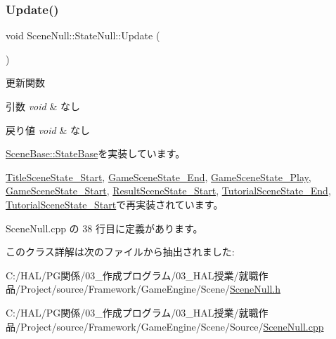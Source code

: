 \subsubsection{\texorpdfstring{Update()}{Update()}}
{\footnotesize\ttfamily void Scene\+Null\+::\+State\+Null\+::\+Update (\begin{DoxyParamCaption}{ }\end{DoxyParamCaption})\hspace{0.3cm}{\ttfamily [virtual]}}



更新関数 


\begin{DoxyParams}{引数}
{\em void} & なし \\
\hline
\end{DoxyParams}

\begin{DoxyRetVals}{戻り値}
{\em void} & なし \\
\hline
\end{DoxyRetVals}


\mbox{\hyperlink{class_scene_base_1_1_state_base_ad2c6c8fd9f020eb02f64f394edee129c}{Scene\+Base\+::\+State\+Base}}を実装しています。



\mbox{\hyperlink{class_title_scene_state___start_a2e98cf6810711b58766d7147168d02eb}{Title\+Scene\+State\+\_\+\+Start}}, \mbox{\hyperlink{class_game_scene_state___end_a969c3c1ec9618cb495f49bc89bc10067}{Game\+Scene\+State\+\_\+\+End}}, \mbox{\hyperlink{class_game_scene_state___play_a14fa99f6138f6c4ef8598210cdb6cc06}{Game\+Scene\+State\+\_\+\+Play}}, \mbox{\hyperlink{class_game_scene_state___start_ae11bb8d8ea9eae4fea2a9acf33dd1c8b}{Game\+Scene\+State\+\_\+\+Start}}, \mbox{\hyperlink{class_result_scene_state___start_a2ecdef2bef0cd1a04055e8687e11199b}{Result\+Scene\+State\+\_\+\+Start}}, \mbox{\hyperlink{class_tutorial_scene_state___end_a7cdf03fa9a0e41ab86c2b41b8165ad09}{Tutorial\+Scene\+State\+\_\+\+End}}, \mbox{\hyperlink{class_tutorial_scene_state___start_a93c322692bf56172f383d3e5b17cd85c}{Tutorial\+Scene\+State\+\_\+\+Start}}で再実装されています。



 Scene\+Null.\+cpp の 38 行目に定義があります。



このクラス詳解は次のファイルから抽出されました\+:\begin{DoxyCompactItemize}
\item 
C\+:/\+H\+A\+L/\+P\+G関係/03\+\_\+作成プログラム/03\+\_\+\+H\+A\+L授業/就職作品/\+Project/source/\+Framework/\+Game\+Engine/\+Scene/\mbox{\hyperlink{_scene_null_8h}{Scene\+Null.\+h}}\item 
C\+:/\+H\+A\+L/\+P\+G関係/03\+\_\+作成プログラム/03\+\_\+\+H\+A\+L授業/就職作品/\+Project/source/\+Framework/\+Game\+Engine/\+Scene/\+Source/\mbox{\hyperlink{_scene_null_8cpp}{Scene\+Null.\+cpp}}\end{DoxyCompactItemize}
